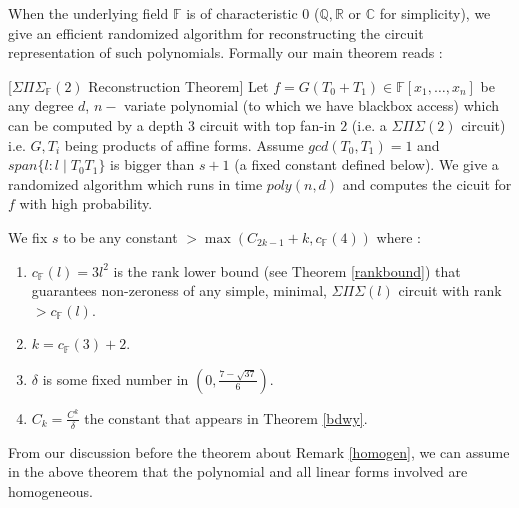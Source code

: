 \documentclass[letterpaper,USenglish,numberwithinsect]{lipics}
\newcommand{\F}{\mathbb{F}}
\newcommand{\Q}{\mathbb{Q}}
\newcommand{\C}{\mathbb{C}}
\newcommand{\R}{\mathbb{R}}
\begin{document}
\par{}
When the underlying field $\F$ is of characteristic $0$ ($\Q,\R$ or $\C$ for simplicity), we give an efficient randomized algorithm for reconstructing the circuit
representation of such polynomials. Formally our main theorem reads :

\begin{theorem}\label{maintheorem}[$\Sigma\Pi\Sigma_\F(2)$ Reconstruction Theorem]
 Let $f = G(T_0+T_1) \in \F[x_1,\ldots,x_n]$ be any degree $d$, $n-$ variate
polynomial (to which we have blackbox access) which can be computed by a depth
$3$ circuit with top fan-in
$2$ (i.e. a $\Sigma\Pi\Sigma(2)$ circuit) i.e. $G,T_i$ being products of affine forms. Assume
$gcd(T_0,T_1)=1$ and $span\{l : l\mid T_0T_1\}$ is bigger than  $s+1$ (a fixed constant defined below).
We give a randomized algorithm which runs
in time $poly(n,d)$ and computes the cicuit for $f$ with high probability.
\end{theorem}

\begin{definition}\label{rvalue}
\begin{mdframed}
We fix $s$ to be any constant $> \max (C_{2k-1}+k, c_\F(4) )$ where :
\begin{enumerate}
\item $c_{\F}(l)=3l^2$ is the rank lower bound (see Theorem \ref{rankbound}) that guarantees non-zeroness of any simple, minimal, $\Sigma\Pi\Sigma(l)$ circuit with rank $> c_\F (l)$.
\item $k = c_{\F}(3) +2$.
\item $\delta$ is some fixed number in $(0,\frac{7-\sqrt{37}}{6})$.
 \item $C_k = \frac{C^k}{\delta}$ the constant that appears in Theorem \ref{bdwy}.

\end{enumerate}
\end{mdframed}
\end{definition}








From our discussion before the theorem about Remark \ref{homogen}, we can assume in the above theorem that the polynomial
and all linear forms involved are homogeneous.
\end{document}
